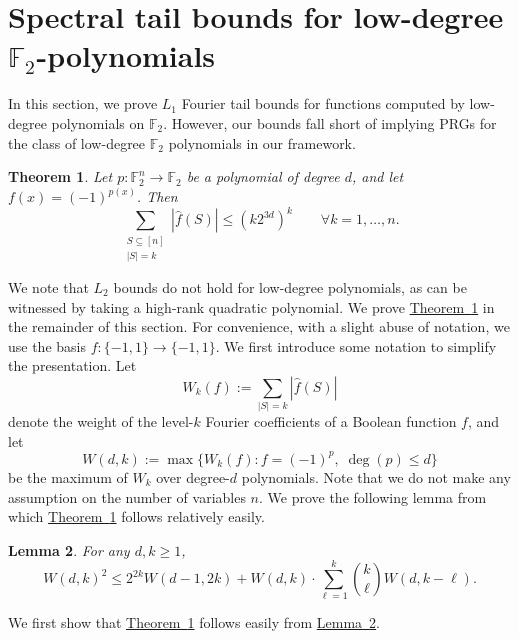 \documentclass[11pt]{article}
\numberwithin{equation}{section}
\newtheorem{theorem}{Theorem}[section]
\newtheorem{lemma}[theorem]{Lemma}
\theoremstyle{definition}
\theoremstyle{plain}
\newcommand{\expref}[2]{\hyperref[#2]{#1~\ref{#2}}}
\newcommand{\F}{\mathbb{F}}
\begin{document}
\section{Spectral tail bounds for low-degree \texorpdfstring{$\F_2$}{F2}-polynomials}
\label{section:lowdegree_spectral}
In this section, we prove  $L_1$ Fourier tail bounds for functions computed by low-degree polynomials on $\F_2$. However, our bounds fall short of implying PRGs for the class of low-degree $\F_2$ polynomials in our framework.
\begin{theorem}
\label{thm:polynomialspectralnorm} Let $p:\F_2^n \to \F_2$ be a polynomial
of degree $d$, and let $f(x)=(-1)^{p(x)}$. Then
$$
\sum_{\substack{S\subseteq [n] \\ |S| = k }} |\widehat{f}(S)| \leq   (k2^{3d})^k \qquad \forall k=1,\ldots,n.
$$
\end{theorem}
We note that $L_2$ bounds do not hold for low-degree polynomials, as can be witnessed by taking a high-rank quadratic polynomial. We prove \expref{Theorem}{thm:polynomialspectralnorm} in the remainder of this section.
For convenience, with a slight abuse of notation, we use the basis $f:\{-1,1\}\rightarrow \{-1,1\}$.
We first introduce some notation to simplify the presentation. Let
$$
W_k(f) := \sum_{|S|=k} |\hat{f}(S)|
$$
denote the weight of the level-$k$ Fourier coefficients of a Boolean
function $f$, and let
$$
W(d,k) := \max \{W_k(f): f=(-1)^p, \; \deg(p) \le d\}
$$
be the maximum of $W_k$ over degree-$d$ polynomials. Note that we do not make any assumption on the number of variables $n$. We prove the following lemma from which \expref{Theorem}{thm:polynomialspectralnorm} follows relatively easily.
\begin{lemma}
\label{lemma:rec_poly} For any $d,k \ge 1$, $$ W(d,k)^{2} \le 2^{2k}W(d-1,2k) + W(d,k) \cdot \sum_{\ell=1}^{k} \binom{k}{\ell}   W(d, k -\ell).$$
\end{lemma}

We first show that \expref{Theorem}{thm:polynomialspectralnorm} follows easily from \expref{Lemma}{lemma:rec_poly}.
\end{document}
